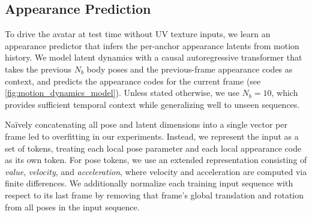 \documentclass[runningheads]{llncs}
\begin{document}
\subsection{Appearance Prediction}
\label{subsec:method_app_prediction}

To drive the avatar at test time without UV texture inputs, we learn an appearance predictor that infers the per-anchor appearance latents from motion history.
We model latent dynamics with a causal autoregressive transformer that takes the previous $N_b$ body poses and the previous-frame appearance codes as context, and predicts the appearance codes for the current frame (see \cref{fig:motion_dynamics_model}).
Unless stated otherwise, we use $N_b{=}10$, which provides sufficient temporal context while generalizing well to unseen sequences.


Naïvely concatenating all pose and latent dimensions into a single vector per frame led to overfitting in our experiments.
Instead, we represent the input as a set of tokens, treating each local pose parameter and each local appearance code as its own token.
For pose tokens, we use an extended representation consisting of \emph{value}, \emph{velocity}, and \emph{acceleration}, where velocity and acceleration are computed via finite differences.
We additionally normalize each training input sequence with respect to its last frame by removing that frame's global translation and rotation from all poses in the input sequence.

\end{document}
